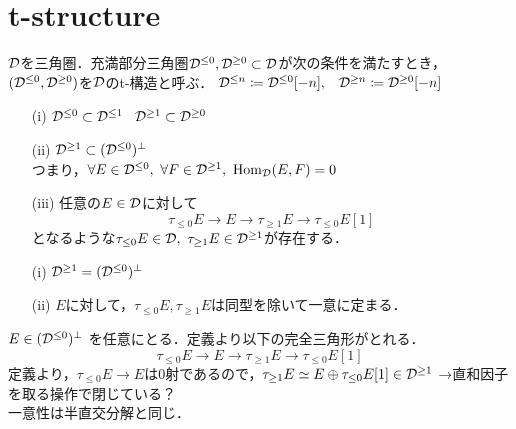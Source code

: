 \section{t-structure}
\begin{defn}
		${\mathcal D}$を三角圏．充満部分三角圏${\mathcal D}^{\le 0},{\mathcal D}^{\ge 0}\subset{\mathcal D}$が次の条件を満たすとき，$({\mathcal D}^{\le 0},{\mathcal D}^{\ge 0})$を${\mathcal D}$のt-構造と呼ぶ．
		${\mathcal D}^{\le n}\coloneq{\mathcal D}^{\le 0}[-n],\hspace{3mm}{\mathcal D}^{\ge n}\coloneq{\mathcal D}^{\ge 0}[-n] $
		\begin{itemize}
			\item[(i)]
				${\mathcal D}^{\le 0}\subset{\mathcal D}^{\le 1}\hspace{3mm}{\mathcal D}^{\ge 1}\subset{\mathcal D}^{\ge 0} $
			\item[(ii)]
				${\mathcal D}^{\ge 1}\subset ({\mathcal D}^{\le 0})^\perp$\\
				つまり，$\forall E\in {\mathcal D}^{\le 0},\ \forall F\in{\mathcal D}^{\ge 1},\ \operatorname{\mathrm{Hom}}_{{\mathcal D}}(E,F)=0$
			\item[(iii)]
				任意の$E\in{\mathcal D}$に対して
				\[\tau_{\le 0}E\rightarrow E \rightarrow \tau_{\ge 1}E\rightarrow \tau_{\le 0}E[1]\]
				となるような$\tau_{\le 0}E\in{\mathcal D},\ \tau_{\ge 1}E\in{\mathcal D}^{\ge 1}$が存在する．
		\end{itemize}
\end{defn}

\begin{lemm}
		\begin{itemize}
				\item[(i)]${\mathcal D}^{\ge 1}=({\mathcal D}^{\le 0})^{\perp}$
				\item[(ii)]$E$に対して，$\tau_{\le 0}E, \tau_{\ge 1}E$は同型を除いて一意に定まる．
		\end{itemize}
\end{lemm}
	\begin{pf}
		$E\in\mathcal ({\mathcal D}^{\le 0})^\perp$ を任意にとる．定義より以下の完全三角形がとれる．
				\[\tau_{\le 0}E\rightarrow E \rightarrow \tau_{\ge 1}E\rightarrow \tau_{\le 0}E[1]\]
				定義より，$\tau_{\le 0}E\rightarrow E$は0射であるので，$\tau_{\ge 1}E\simeq E\oplus\tau_{\le 0}E[1]\in {\mathcal D}^{\ge 1}$ →直和因子を取る操作で閉じている？\\
一意性は半直交分解と同じ．
\end{pf}

